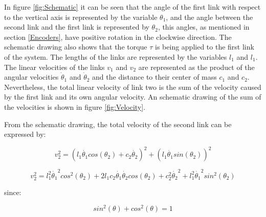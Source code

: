 \documentclass[main.tex]{subfiles}
\begin{document}
In figure \ref{fig:Schematic} it can be seen that the angle of the first link with respect to the vertical axis is represented by the variable $\theta_1$, and the angle between the second link and the first link is represented by  $\theta_2$, this angles, as mentioned in section \ref{Encoders}, have positive rotation in the clockwise direction. The schematic drawing also shows that the torque $\tau$ is being applied to the first link of the system. The lengths of the links are represented by the variables $l_1$ and $l_1$. The linear velocities of the links $v_1$ and $v_2$ are represented as the product of the angular velocities $\dot{\theta}_1$ and $\dot{\theta}_2$ and the distance to their center of mass $c_1$ and $c_2$. Nevertheless, the total linear velocity of link two is the sum of the velocity caused by the first link and its own angular velocity. An schematic drawing of the sum of the velocities is shown in figure \ref{fig:Velocity}.

From the schematic drawing, the total velocity of the second link can be expressed by:

\begin{equation} 
	v_2^2=(l_1\dot{\theta_1}cos(\theta_2)+c_2\dot{\theta_2})^2+(l_1\dot{\theta_1}sin(\theta_2))^2
\end{equation}

\begin{equation}  v_2^2=l_1^2\dot{\theta_1}^2cos^2(\theta_2)+2l_1c_2\dot{\theta_1}\dot{\theta_2}cos(\theta_2)+c_2^2\dot{\theta_2}^2+l_1^2\dot{\theta_1}^2sin^2(\theta_2)
\end{equation}

since:

\begin{equation*}  
sin^2(\theta)+cos^2(\theta)=1
\end{equation*}
\end{document}
